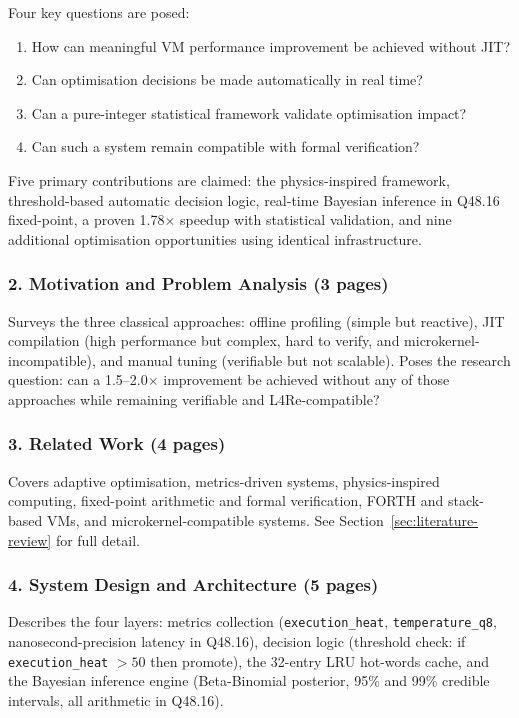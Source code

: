 Four key questions are posed:
\begin{enumerate}
  \item How can meaningful VM performance improvement be achieved without JIT?
  \item Can optimisation decisions be made automatically in real time?
  \item Can a pure-integer statistical framework validate optimisation impact?
  \item Can such a system remain compatible with formal verification?
\end{enumerate}

Five primary contributions are claimed: the physics-inspired framework,
threshold-based automatic decision logic, real-time Bayesian inference in
Q48.16 fixed-point, a proven 1.78$\times$ speedup with statistical
validation, and nine additional optimisation opportunities using identical
infrastructure.

\subsubsection{2. Motivation and Problem Analysis (3 pages)}

Surveys the three classical approaches: offline profiling (simple but
reactive), JIT compilation (high performance but complex, hard to verify,
and microkernel-incompatible), and manual tuning (verifiable but not
scalable). Poses the research question: can a 1.5--2.0$\times$ improvement
be achieved without any of those approaches while remaining verifiable and
L4Re-compatible?

\subsubsection{3. Related Work (4 pages)}

Covers adaptive optimisation, metrics-driven systems, physics-inspired
computing, fixed-point arithmetic and formal verification, FORTH and
stack-based VMs, and microkernel-compatible systems. See
Section~\ref{sec:literature-review} for full detail.

\subsubsection{4. System Design and Architecture (5 pages)}

Describes the four layers: metrics collection (\texttt{execution\_heat},
\texttt{temperature\_q8}, nanosecond-precision latency in Q48.16), decision
logic (threshold check: if \texttt{execution\_heat} $> 50$ then promote),
the 32-entry LRU hot-words cache, and the Bayesian inference engine
(Beta-Binomial posterior, 95\% and 99\% credible intervals, all arithmetic
in Q48.16).

